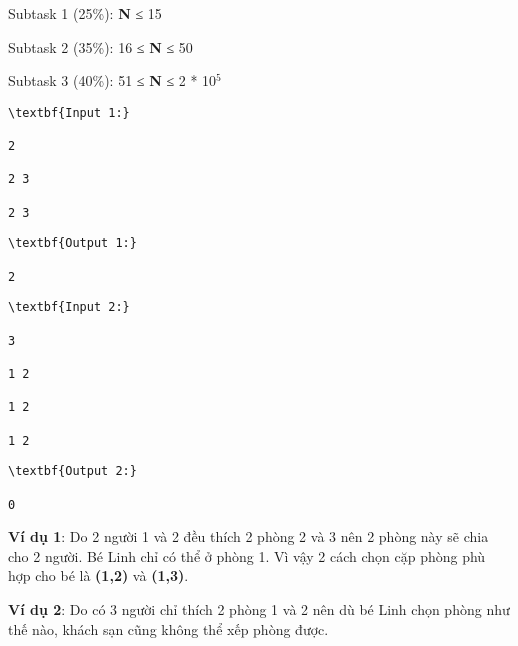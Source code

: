 Subtask 1 (25\%): \textbf{N} ≤ 15

Subtask 2 (35\%): 16 ≤ \textbf{N} ≤ 50

Subtask 3 (40\%): 51 ≤ \textbf{N} ≤ 2 * 10$^5$
\begin{verbatim}
\textbf{Input 1:}

2

2 3

2 3

\end{verbatim}
\begin{verbatim}
\textbf{Output 1:}

2

\end{verbatim}
\begin{verbatim}
\textbf{Input 2:}

3

1 2

1 2

1 2

\end{verbatim}
\begin{verbatim}
\textbf{Output 2:}

0

\end{verbatim}
\textbf{Ví dụ 1}: Do 2 người 1 và 2 đều thích 2 phòng 2 và 3 nên 2 phòng này sẽ chia cho 2 người. Bé Linh chỉ có thể ở phòng 1. Vì vậy 2 cách chọn cặp phòng phù hợp cho bé là \textbf{(1,2)} và \textbf{(1,3)}.

\textbf{Ví dụ 2}: Do có 3 người chỉ thích 2 phòng 1 và 2 nên dù bé Linh chọn phòng như thế nào, khách sạn cũng không thể xếp phòng được.